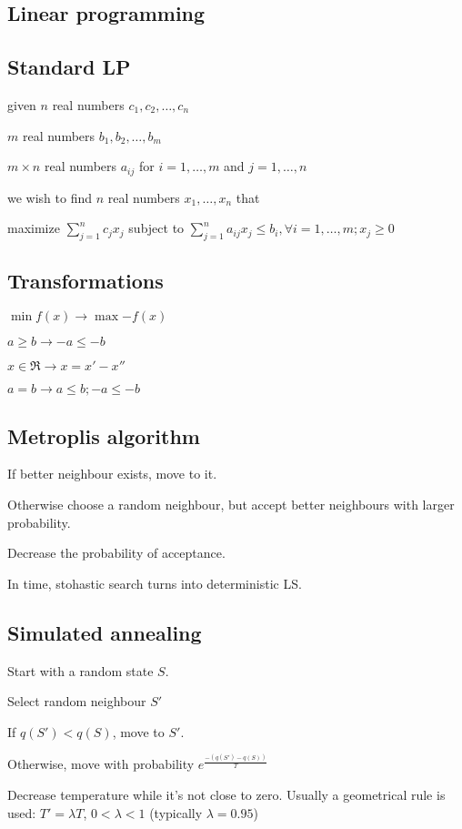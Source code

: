 \documentclass[a4paper]{article}
\begin{document}
\begin{multicols*}{2}
{	\section{Linear programming}
	\subsection{Standard LP}
	\begin{compactitem}
		\item given $n$ real numbers $c_1,c_2,\ldots,c_n$
		\item $m$ real numbers $b_1,b_2,\ldots,b_m$
		\item $m\times n$ real numbers $a_{ij}$ for $i=1,\ldots,m$ and $j=1,\ldots,n$
		\item we wish to find $n$ real numbers $x_1,\ldots,x_n$ that
	\end{compactitem}
	maximize $\sum_{j=1}^nc_jx_j$ subject to
	$\sum_{j=1}^na_{ij}x_j\leq b_i, \forall i=1,\ldots,m; x_j\geq 0$

	\subsection{Transformations}
	\begin{compactitem}
		\item $\min{f(x)} \rightarrow \max{-f(x)}$
		\item $a \geq b \rightarrow -a \leq -b$
		\item $x \in \Re \rightarrow x = x' - x''$
		\item $a = b \rightarrow a \leq b; -a \leq -b$
	\end{compactitem}

	\subsection{Metroplis algorithm}
	\begin{compactitem}
		\item If better neighbour exists, move to it.
		\item Otherwise choose a random neighbour, but accept better neighbours with larger probability.
		\item Decrease the probability of acceptance.
		\item In time, stohastic search turns into deterministic LS.
	\end{compactitem}
	\subsection{Simulated annealing}
	\begin{compactitem}
		\item Start with a random state $S$.
		\item Select random neighbour $S\prime$
		\item If $q(S\prime) < q(S)$, move to $S\prime$.
		\item Otherwise, move with probability $e^\frac{-(q(S\prime)-q(S))}{T}$
	\end{compactitem}
	Decrease temperature while it's not close to zero.
	Usually a geometrical rule is used: $T\prime = \lambda T$, $0<\lambda<1$ (typically $\lambda = 0.95$)
}
\end{multicols*}
\end{document}
